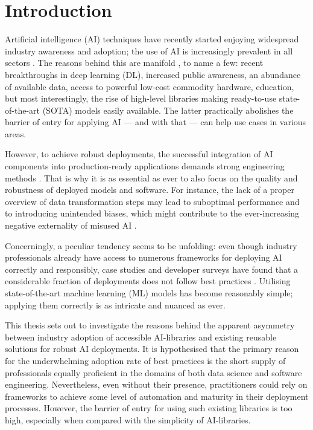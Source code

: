 \chapter{Introduction}

Artificial intelligence (AI) techniques have recently started enjoying widespread industry awareness and adoption; the use of AI is increasingly prevalent in all sectors \cite{wirtz2019artificial,bosch2021engineering}. The reasons behind this are manifold \cite{jordan2015machine}, to name a few: recent breakthroughs in deep learning (DL), increased public awareness, an abundance of available data, access to powerful low-cost commodity hardware, education, but most interestingly, the rise of high-level libraries making ready-to-use state-of-the-art (SOTA) models easily available. The latter practically abolishes the barrier of entry for applying AI --- and with that --- can help use cases in various areas. 

However, to achieve robust deployments, the successful integration of AI components into production-ready applications demands strong engineering methods \cite{serban2020adoption}. That is why it is as essential as ever to also focus on the quality and robustness of deployed models and software. For instance, the lack of a proper overview of data transformation steps may lead to suboptimal performance and to introducing unintended biases, which might contribute to the ever-increasing negative externality of misused AI \cite{o2016weapons}.

Concerningly, a peculiar tendency seems to be unfolding: even though industry professionals already have access to numerous frameworks for deploying AI correctly and responsibly, case studies and developer surveys have found that a considerable fraction of deployments does not follow best practices \cite{serban2020adoption,haakman2021ai,amershi2019software,de2019understanding,sculley2015hidden}. Utilising state-of-the-art machine learning (ML) models has become reasonably simple; applying them correctly is as intricate and nuanced as ever. 

This thesis sets out to investigate the reasons behind the apparent asymmetry between industry adoption of accessible AI-libraries and existing reusable solutions for robust AI deployments. It is hypothesised that the primary reason for the underwhelming adoption rate of best practices is the short supply of professionals equally proficient in the domains of both data science and software engineering. Nevertheless, even without their presence, practitioners could rely on frameworks to achieve some level of automation and maturity in their deployment processes. However, the barrier of entry for using such existing libraries is too high, especially when compared with the simplicity of AI-libraries.


